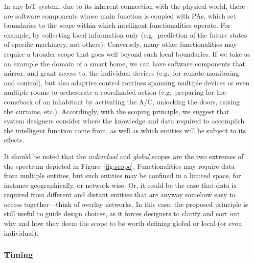 In any IoT system, due to its inherent connection with the physical world, there are software components whose main function 
is coupled with PAs, which set boundaries to the \emph{scope} within which intelligent functionalities operate. 
For example, by collecting local information only (e.g.\ prediction of the future states of specific machinery, not others). 
%
Conversely, many other functionalities may require a broader scope that goes well beyond such local boundaries. 
%
If we take as an example the domain of a smart home, we can have 
software components that mirror, and grant access to, the individual devices (e.g.\ for remote monitoring and control), 
but also adaptive control routines spanning multiple devices or even multiple rooms to orchestrate a coordinated action (e.g.\ preparing for the comeback of an inhabitant by activating the A/C, unlocking the doors, raising the curtains, etc.). 
%
Accordingly, with the scoping principle, we suggest that system designers consider where the knowledge and data required to accomplish the intelligent function come from, as well as which entities will be subject to its effects. 
%


It should be noted that the \emph{individual} and \emph{global} scopes are the two extremes of the spectrum depicted in Figure~\ref{fig:scope}. 
Functionalities may require data from multiple entities, but such entities may be confined in a limited space, for instance geographically, or network-wise. 
Or, it could be the case that data is required from different and distant entities that are anyway somehow easy to access together---think of overlay networks. 
%
In this case, the proposed principle is still useful to guide design choices, as it forces designers to clarify and sort out why and how they deem the scope to be worth defining global or local (or even individual). 


\subsubsection{Timing} 

